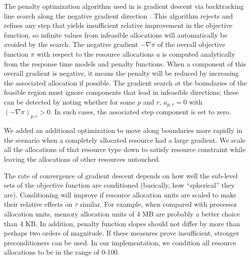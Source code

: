 The penalty optimization algorithm used in \pacora is gradient descent via backtracking line search along the negative gradient direction \cite{BoVa}.
This algorithm rejects and refines any step that yields insufficient relative improvement in the objective function,
so infinite values from infeasible allocations will automatically be avoided by the search.
The negative gradient $-\nabla\pi$ of the overall objective function $\pi$
with respect to the resource allocations $a$
is computed analytically from the response time models and penalty functions.
When a component of this overall gradient is negative,
it means the penalty will be reduced by increasing the associated allocation if possible.
The gradient search at the boundaries of the feasible region
must ignore components that lead in infeasible directions;
these can be detected by noting whether for some $p$ and $r$, $a_{p,r} = 0$ with $(-\nabla\pi)_{p,r} > 0$.
In such cases, the associated step component is set to zero.

We added an additional optimization to move along boundaries more rapidly in the scenario when a completely allocated resource had a large gradient.  We scale all the allocations of that resource type down to satisfy resource constraint while leaving the allocations of other resources untouched.

The rate of convergence of gradient descent depends on how well the sub-level sets of the objective function
are conditioned (basically, how ``spherical'' they are).
Conditioning will improve if resource allocation units are scaled to make their relative effects on $\tau$ similar.
For example, when compared with processor allocation units,
memory allocation units of 4 MB are probably a better choice than 4 KB.
In addition, penalty function slopes should not differ by more than perhaps two orders of magnitude. If these measures prove insufficient, stronger preconditioners can be used. In our implementation, we condition all resource allocations to be in the range of 0-100.




